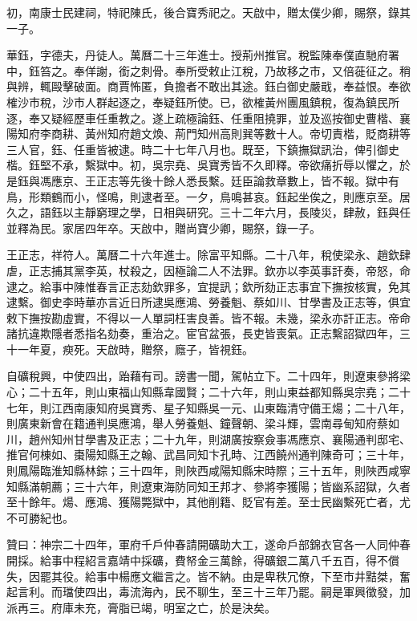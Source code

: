 \begin{pinyinscope}
初，南康士民建祠，特祀陳氏，後合寶秀祀之。天啟中，贈太僕少卿，賜祭，錄其一子。

華鈺，字德夫，丹徒人。萬曆二十三年進士。授荊州推官。稅監陳奉僕直馳府署中，鈺笞之。奉佯謝，銜之刺骨。奉所受敕止江稅，乃故移之市，又倍蓰征之。稍與辨，輒毆擊破面。商賈怖匿，負擔者不敢出其途。鈺白御史嚴戢，奉益恨。奉欲榷沙市稅，沙市人群起逐之，奉疑鈺所使。已，欲榷黃州團風鎮稅，復為鎮民所逐，奉又疑經歷車任重教之。遂上疏極論鈺、任重阻撓罪，並及巡按御史曹楷、襄陽知府李商耕、黃州知府趙文煥、荊門知州高則巽等數十人。帝切責楷，貶商耕等三人官，鈺、任重皆被逮。時二十七年八月也。既至，下鎮撫獄訊治，俾引御史楷。鈺堅不承，繫獄中。初，吳宗堯、吳寶秀皆不久即釋。帝欲痛折辱以懼之，於是鈺與馮應京、王正志等先後十餘人悉長繫。廷臣論救章數上，皆不報。獄中有鳥，形類鶴而小，怪鳴，則逮者至。一夕，鳥鳴甚哀。鈺起坐俟之，則應京至。居久之，語鈺以主靜窮理之學，日相與研究。三十二年六月，長陵災，肆赦，鈺與任並釋為民。家居四年卒。天啟中，贈尚寶少卿，賜祭，錄一子。

王正志，祥符人。萬曆二十六年進士。除富平知縣。二十八年，稅使梁永、趙欽肆虐，正志捕其黨李英，杖殺之，因極論二人不法罪。欽亦以李英事訐奏，帝怒，命逮之。給事中陳惟春言正志劾欽罪多，宜提訊；欽所劾正志事宜下撫按核實，免其逮繫。御史李時華亦言近日所逮吳應鴻、勞養魁、蔡如川、甘學書及正志等，俱宜敕下撫按勘虛實，不得以一人單詞枉害良善。皆不報。未幾，梁永亦訐正志。帝命諸抗違欺隱者悉指名劾奏，重治之。宦官盆張，長吏皆喪氣。正志繫詔獄四年，三十一年夏，瘐死。天啟時，贈祭，廕子，皆視鈺。

自礦稅興，中使四出，跆藉有司。謗書一聞，駕帖立下。二十四年，則遼東參將梁心；二十五年，則山東福山知縣韋國賢；二十六年，則山東益都知縣吳宗堯；二十七年，則江西南康知府吳寶秀、星子知縣吳一元、山東臨清守備王煬；二十八年，則廣東新會在籍通判吳應鴻，舉人勞養魁、鐘聲朝、梁斗輝，雲南尋甸知府蔡如川，趙州知州甘學書及正志；二十九年，則湖廣按察僉事馮應京、襄陽通判邸宅、推官何棟如、棗陽知縣王之翰、武昌同知卞孔時、江西饒州通判陳奇可；三十年，則鳳陽臨淮知縣林錝；三十四年，則陜西咸陽知縣宋時際；三十五年，則陜西咸寧知縣滿朝薦；三十六年，則遼東海防同知王邦才、參將李獲陽；皆幽系詔獄，久者至十餘年。煬、應鴻、獲陽斃獄中，其他削籍、貶官有差。至士民幽繫死亡者，尤不可勝紀也。

贊曰：神宗二十四年，軍府千戶仲春請開礦助大工，遂命戶部錦衣官各一人同仲春開採。給事中程紹言嘉靖中採礦，費帑金三萬餘，得礦銀二萬八千五百，得不償失，因罷其役。給事中楊應文繼言之。皆不納。由是卑秩冗僚，下至市井黠桀，奮起言利。而璫使四出，毒流海內，民不聊生，至三十三年乃罷。嗣是軍興徵發，加派再三。府庫未充，膏脂已竭，明室之亡，於是決矣。


\end{pinyinscope}